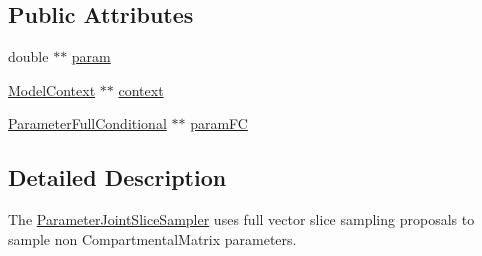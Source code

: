 \subsection*{Public Attributes}
\begin{DoxyCompactItemize}
\item 
double $\ast$$\ast$ \hyperlink{classSpatialSEIR_1_1ParameterJointSliceSampler_a405ce2949e75688013da196ecc139fa6}{param}
\item 
\hyperlink{classSpatialSEIR_1_1ModelContext}{Model\-Context} $\ast$$\ast$ \hyperlink{classSpatialSEIR_1_1ParameterJointSliceSampler_adc70f8f5143b09aa830aa7b1c12c0853}{context}
\item 
\hyperlink{classSpatialSEIR_1_1ParameterFullConditional}{Parameter\-Full\-Conditional} $\ast$$\ast$ \hyperlink{classSpatialSEIR_1_1ParameterJointSliceSampler_a898ccd247b2ef346005ac437a600f4d4}{param\-F\-C}
\end{DoxyCompactItemize}


\subsection{Detailed Description}
The \hyperlink{classSpatialSEIR_1_1ParameterJointSliceSampler}{Parameter\-Joint\-Slice\-Sampler} uses full vector slice sampling proposals to sample non Compartmental\-Matrix parameters. 

